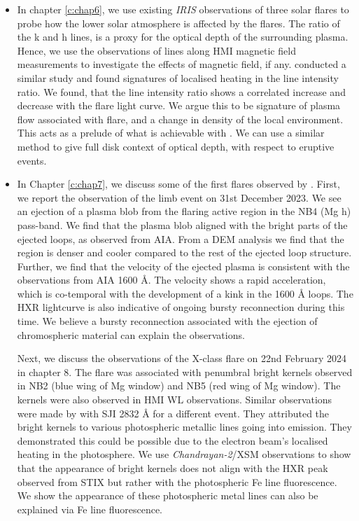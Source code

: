 \begin{itemize}
    \item In chapter \ref{c:chap6}, we use existing {\it IRIS} observations of three solar flares to probe how the lower solar atmosphere is affected by the flares. The ratio of the  k and h lines, is a proxy for the optical depth of the surrounding plasma. Hence, we use the observations of  lines along HMI magnetic field measurements to investigate the effects of magnetic field, if any. \cite{kerr15} conducted a similar study and found signatures of localised heating in the line intensity ratio. We found, that the line intensity ratio shows a correlated increase and decrease with the flare light curve. We argue this to be signature of plasma flow associated with flare, and a change in density of the local environment. This acts as a prelude of what is achievable with {\suit}. We can use a similar method to give full disk context of optical depth, with respect to eruptive events.

    \item In Chapter \ref{c:chap7}, we discuss some of the first flares observed by {\suit}. First, we report the observation of the limb event on 31st December 2023. We see an ejection of a plasma blob from the flaring active region in the NB4 (Mg  h) pass-band. We find that the plasma blob aligned with the bright parts of the ejected loops, as observed from AIA. From a DEM analysis we find that the region is denser and cooler compared to the rest of the ejected loop structure. Further, we find that the velocity of the ejected plasma is consistent with the observations from AIA 1600 {\AA}. The velocity shows a rapid acceleration, which is co-temporal with the development of a kink in the 1600 {\AA} loops. The HXR lightcurve is also indicative of ongoing bursty reconnection during this time. We believe a bursty reconnection associated with the ejection of chromospheric material can explain the {\suit} observations.

    Next, we discuss the observations of the X-class flare on 22nd February 2024 in chapter 8. The flare was associated with penumbral bright kernels observed in NB2 (blue wing of Mg  window) and NB5 (red wing of Mg  window). The kernels were also observed in HMI WL observations. Similar observations were made by \cite{kowalski19} with SJI 2832 {\AA} for a different event. They attributed the bright kernels to various photospheric metallic lines going into emission. They demonstrated this could be possible due to the electron beam's localised heating in the photosphere. We use {\it Chandrayan-2}/XSM observations to show that the appearance of bright kernels does not align with the HXR peak observed from STIX but rather with the photospheric Fe line fluorescence. We show the appearance of these photospheric metal lines can also be explained via Fe line fluorescence.
    

\end{itemize}
